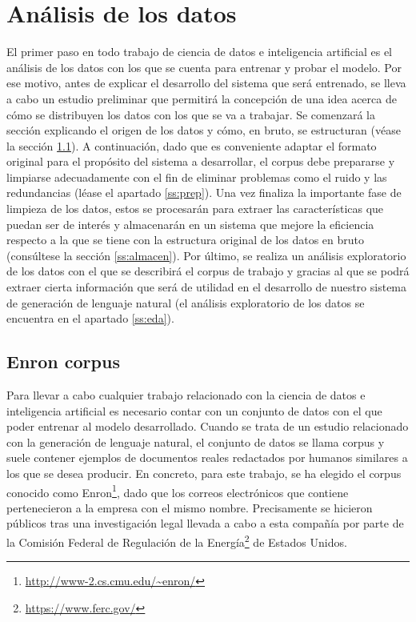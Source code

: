 \section{Análisis de los datos}
El primer paso en todo trabajo de ciencia de datos e inteligencia artificial es el análisis de los datos con los que se cuenta para entrenar y probar el modelo. Por ese motivo, antes de explicar el desarrollo del sistema que será entrenado, se lleva a cabo un estudio preliminar que permitirá la concepción de una idea acerca de cómo se distribuyen los datos con los que se va a trabajar. Se comenzará la sección explicando el origen de los datos y cómo, en bruto, se estructuran (véase la sección \ref{ss:enron}). A continuación, dado que es conveniente adaptar el formato original para el propósito del sistema a desarrollar, el corpus debe prepararse y limpiarse adecuadamente con el fin de eliminar problemas como el ruido y las redundancias (léase el apartado \ref{ss:prep}). Una vez finaliza la importante fase de limpieza de los datos, estos se procesarán para extraer las características que puedan ser de interés y almacenarán en un sistema que mejore la eficiencia respecto a la que se tiene con la estructura original de los datos en bruto (consúltese la sección \ref{ss:almacen}). Por último, se realiza un análisis exploratorio de los datos con el que se describirá el corpus de trabajo y gracias al que se podrá extraer cierta información que será de utilidad en el desarrollo de nuestro sistema de generación de lenguaje natural (el análisis exploratorio de los datos se encuentra en el apartado \ref{ss:eda}).

\subsection{Enron corpus}\label{ss:enron}
Para llevar a cabo cualquier trabajo relacionado con la ciencia de datos e inteligencia artificial es necesario contar con un conjunto de datos con el que poder entrenar al modelo desarrollado. Cuando se trata de un estudio relacionado con la generación de lenguaje natural, el conjunto de datos se llama corpus y suele contener ejemplos de documentos reales redactados por humanos similares a los que se desea producir. En concreto, para este trabajo, se ha elegido el corpus conocido como Enron\footnote{\url{http://www-2.cs.cmu.edu/~enron/}}, dado que los correos electrónicos que contiene pertenecieron a la empresa con el mismo nombre. Precisamente se hicieron públicos tras una investigación legal llevada a cabo a esta compañía por parte de la Comisión Federal de Regulación de la Energía\footnote{\url{https://www.ferc.gov/}} de Estados Unidos.


